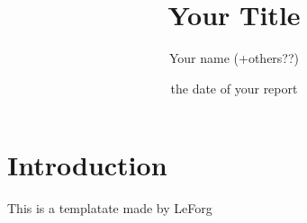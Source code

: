 \documentclass[10pt]{report}
\title{\Huge\bfseries{Your Title}}
\author{Your name (+others??)}
\date{the date of your report}
\begin{document}
\maketitle
\tableofcontents
\listoffigures

\chapter*{Introduction}

\large{
  This is a templatate made by LeForg \cite{leforg}
}



\normalsize


\newpage


\appendix






\end{document}
